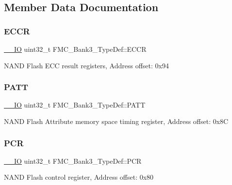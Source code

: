 \subsection{Member Data Documentation}
\mbox{\label{struct_f_m_c___bank3___type_def_ab6c1398fb7158f021ab78a4231c67054}} 
\subsubsection{\texorpdfstring{ECCR}{ECCR}}
{\footnotesize\ttfamily \mbox{\hyperlink{core__sc300_8h_aec43007d9998a0a0e01faede4133d6be}{\+\_\+\+\_\+\+IO}} uint32\+\_\+t F\+M\+C\+\_\+\+Bank3\+\_\+\+Type\+Def\+::\+E\+C\+CR}

N\+A\+ND Flash E\+CC result registers, Address offset\+: 0x94 \mbox{\label{struct_f_m_c___bank3___type_def_a4cca3d0ef62651cc93d4070278bb5376}} 
\subsubsection{\texorpdfstring{PATT}{PATT}}
{\footnotesize\ttfamily \mbox{\hyperlink{core__sc300_8h_aec43007d9998a0a0e01faede4133d6be}{\+\_\+\+\_\+\+IO}} uint32\+\_\+t F\+M\+C\+\_\+\+Bank3\+\_\+\+Type\+Def\+::\+P\+A\+TT}

N\+A\+ND Flash Attribute memory space timing register, Address offset\+: 0x8C \mbox{\label{struct_f_m_c___bank3___type_def_ad7e74bf59532cbe667231e321bdf0de2}} 
\subsubsection{\texorpdfstring{PCR}{PCR}}
{\footnotesize\ttfamily \mbox{\hyperlink{core__sc300_8h_aec43007d9998a0a0e01faede4133d6be}{\+\_\+\+\_\+\+IO}} uint32\+\_\+t F\+M\+C\+\_\+\+Bank3\+\_\+\+Type\+Def\+::\+P\+CR}

N\+A\+ND Flash control register, Address offset\+: 0x80 \mbox{\label{struct_f_m_c___bank3___type_def_af34d82c290385286c11648a983ab3e71}} 
